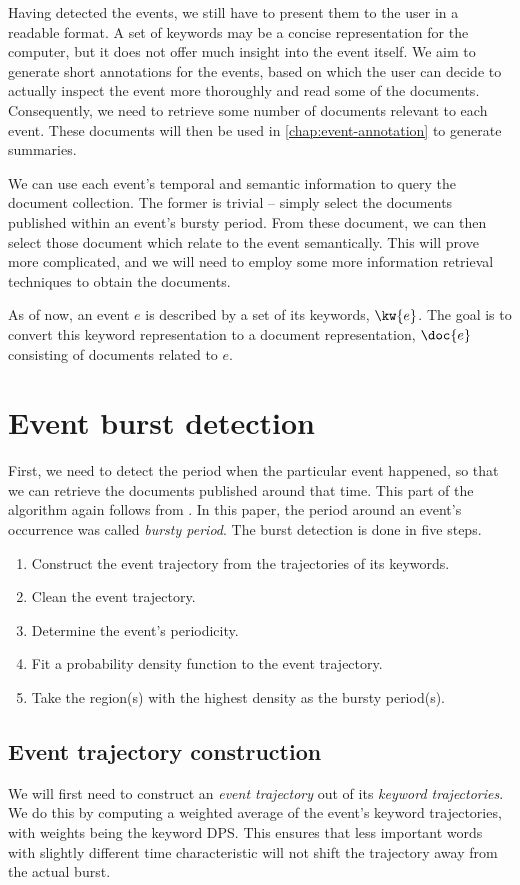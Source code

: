Having detected the events, we still have to present them to the user in a readable format. A set of keywords may be a concise representation for the computer, but it does not offer much insight into the event itself. We aim to generate short annotations for the events, based on which the user can decide to actually inspect the event more thoroughly and read some of the documents. Consequently, we need to retrieve some number of documents relevant to each event. These documents will then be used in \autoref{chap:event-annotation} to generate summaries.

We can use each event's temporal and semantic information to query the document collection. The former is trivial -- simply select the documents published within an event's bursty period. From these document, we can then select those document which relate to the event semantically. This will prove more complicated, and we will need to employ some more information retrieval techniques to obtain the documents.

As of now, an event $e$ is described by a set of its keywords, $\kw{e}$. The goal is to convert this keyword representation to a document representation, $\doc{e}$ consisting of documents related to $e$.

\section{Event burst detection}
First, we need to detect the period when the particular event happened, so that we can retrieve the documents published around that time. This part of the algorithm again follows from \cite{event-detection}. In this paper, the period around an event's occurrence was called \textit{bursty period}. The burst detection is done in five steps.

\begin{enumerate}
	\item Construct the event trajectory from the trajectories of its keywords.
	\item Clean the event trajectory.
	\item Determine the event's periodicity.
	\item Fit a probability density function to the event trajectory.
	\item Take the region(s) with the highest density as the bursty period(s).
\end{enumerate}


\subsection{Event trajectory construction}
We will first need to construct an \textit{event trajectory} out of its \textit{keyword trajectories}. We do this by computing a weighted average of the event's keyword trajectories, with weights being the keyword DPS. This ensures that less important words with slightly different time characteristic will not shift the trajectory away from the actual burst.

